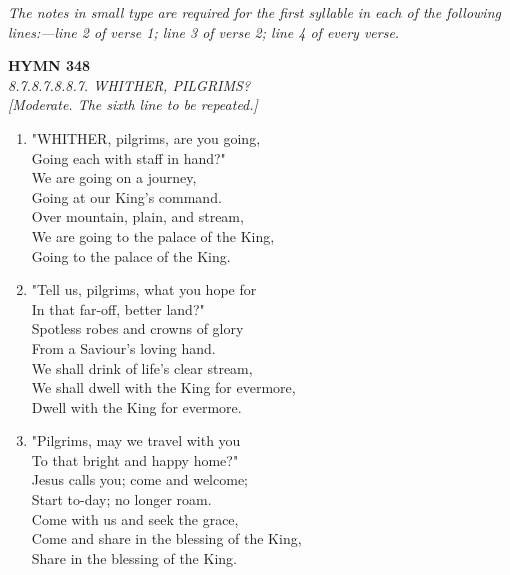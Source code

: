 \vspace{1em}
\noindent \textit{The notes in small type are required for the first syllable in each of the following lines:---line 2 of verse 1; line 3 of verse 2; line 4 of every verse.}

\newpage
\begin{center}
    {\Large \textbf{HYMN 348}}
    \\
    \textit{8.7.8.7.8.8.7. WHITHER, PILGRIMS?}
    \\
    \textit{\small [Moderate. The sixth line to be repeated.]}
\end{center}
\vspace{1em}

\begin{enumerate}
    \item "WHITHER, pilgrims, are you going, \\
        Going each with staff in hand?" \\
        We are going on a journey, \\
        Going at our King's command. \\
        Over mountain, plain, and stream, \\
        We are going to the palace of the King, \\
        Going to the palace of the King.

    \item "Tell us, pilgrims, what you hope for \\
        In that far-off, better land?" \\
        Spotless robes and crowns of glory \\
        From a Saviour's loving hand. \\
        We shall drink of life's clear stream, \\
        We shall dwell with the King for evermore, \\
        Dwell with the King for evermore.

    \item "Pilgrims, may we travel with you \\
        To that bright and happy home?" \\
        Jesus calls you; come and welcome; \\
        Start to-day; no longer roam. \\
        Come with us and seek the grace, \\
        Come and share in the blessing of the King, \\
        Share in the blessing of the King.

\end{enumerate}

